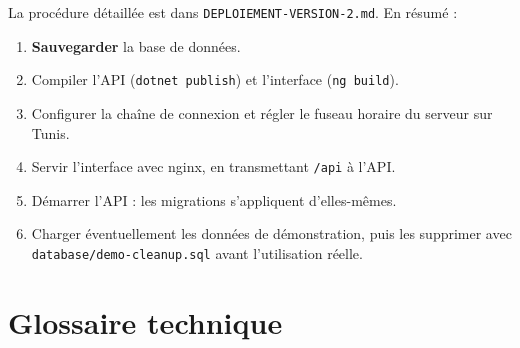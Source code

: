 \documentclass[11pt,a4paper]{article}
\newcommand{\code}[1]{\texttt{\small #1}}                   %
\begin{document}
La procédure détaillée est dans \code{DEPLOIEMENT-VERSION-2.md}. En résumé :
\begin{enumerate}
  \item \textbf{Sauvegarder} la base de données.
  \item Compiler l'API (\code{dotnet publish}) et l'interface (\code{ng build}).
  \item Configurer la chaîne de connexion et régler le fuseau horaire du serveur sur Tunis.
  \item Servir l'interface avec nginx, en transmettant \code{/api} à l'API.
  \item Démarrer l'API : les migrations s'appliquent d'elles-mêmes.
  \item Charger éventuellement les données de démonstration, puis les supprimer avec \code{database/demo-cleanup.sql} avant l'utilisation réelle.
\end{enumerate}

\section{Glossaire technique}
\end{document}
